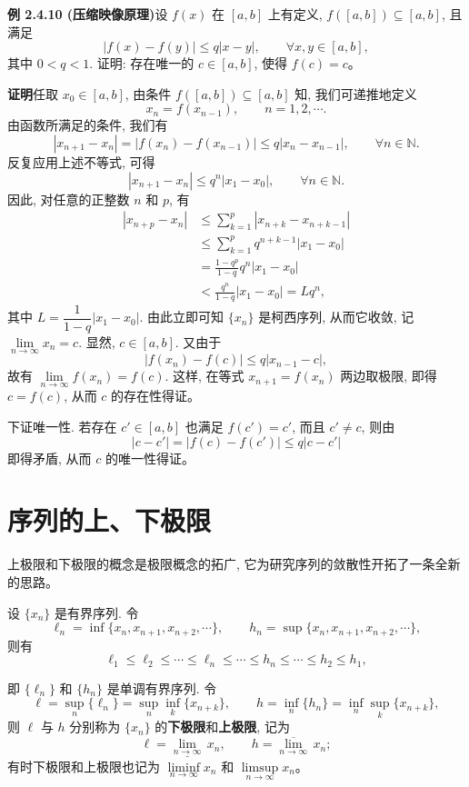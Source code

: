 \documentclass[UTF8, 12pt, fontset=fandol, oneside]{ctexart}
\begin{document}
\noindent\textbf{例 2.4.10 (压缩映像原理)}\quad 设 $f(x)$ 在 $[a,b]$ 上有定义, $f([a,b])\subseteq[a,b]$, 且满足
\[
  |f(x)-f(y)|\leqslant q|x-y|,\qquad \forall x,y\in[a,b],
\]
其中 $0<q<1$. 证明: 存在唯一的 $c\in[a,b]$, 使得 $f(c)=c$。

\noindent\textbf{证明}\quad 任取 $x_0\in[a,b]$, 由条件 $f([a,b])\subseteq[a,b]$ 知, 我们可递推地定义
\[
  x_n=f(x_{n-1}),\qquad n=1,2,\cdots.
\]
由函数所满足的条件, 我们有
\[
  |x_{n+1}-x_n|
  =
  |f(x_n)-f(x_{n-1})|
  \leqslant q|x_n-x_{n-1}|,\qquad \forall n\in\mathbb{N}.
\]
反复应用上述不等式, 可得
\[
  |x_{n+1}-x_n|\leqslant q^n|x_1-x_0|,\qquad \forall n\in\mathbb{N}.
\]
因此, 对任意的正整数 $n$ 和 $p$, 有
\[
\begin{aligned}
  |x_{n+p}-x_n|
  &\leqslant \sum_{k=1}^p |x_{n+k}-x_{n+k-1}|\\
  &\leqslant \sum_{k=1}^p q^{n+k-1}|x_1-x_0|\\
  &=
  \frac{1-q^p}{1-q}q^n|x_1-x_0|\\
  &<
  \frac{q^n}{1-q}|x_1-x_0|=Lq^n,
\end{aligned}
\]
其中 $L=\dfrac1{1-q}|x_1-x_0|$. 由此立即可知 $\{x_n\}$ 是柯西序列, 从而它收敛, 记 $\lim\limits_{n\to\infty}x_n=c$. 显然, $c\in[a,b]$. 又由于
\[
  |f(x_n)-f(c)|\leqslant q|x_{n-1}-c|,
\]
故有 $\lim\limits_{n\to\infty}f(x_n)=f(c)$. 这样, 在等式 $x_{n+1}=f(x_n)$ 两边取极限, 即得 $c=f(c)$, 从而 $c$ 的存在性得证。

下证唯一性. 若存在 $c'\in[a,b]$ 也满足 $f(c')=c'$, 而且 $c'\ne c$, 则由
\[
  |c-c'|=|f(c)-f(c')|\leqslant q|c-c'|
\]
即得矛盾, 从而 $c$ 的唯一性得证。

\section{序列的上、下极限}

上极限和下极限的概念是极限概念的拓广, 它为研究序列的敛散性开拓了一条全新的思路。

设 $\{x_n\}$ 是有界序列. 令
\[
  \ell_n=\inf\{x_n,x_{n+1},x_{n+2},\cdots\},
  \qquad
  h_n=\sup\{x_n,x_{n+1},x_{n+2},\cdots\},
\]
则有
\[
  \ell_1\leqslant\ell_2\leqslant\cdots\leqslant\ell_n\leqslant\cdots\leqslant h_n\leqslant\cdots\leqslant h_2\leqslant h_1,
\]

即 $\{\ell_n\}$ 和 $\{h_n\}$ 是单调有界序列. 令
\[
  \ell=\sup_n\{\ell_n\}=\sup_n\inf_k\{x_{n+k}\},
  \qquad
  h=\inf_n\{h_n\}=\inf_n\sup_k\{x_{n+k}\},
\]
则 $\ell$ 与 $h$ 分别称为 $\{x_n\}$ 的\textbf{下极限}和\textbf{上极限}, 记为
\[
  \ell=\underline{\lim_{n\to\infty}}\,x_n,\qquad
  h=\overline{\lim_{n\to\infty}}\,x_n;
\]
有时下极限和上极限也记为 $\liminf\limits_{n\to\infty}x_n$ 和 $\limsup\limits_{n\to\infty}x_n$。
\end{document}
